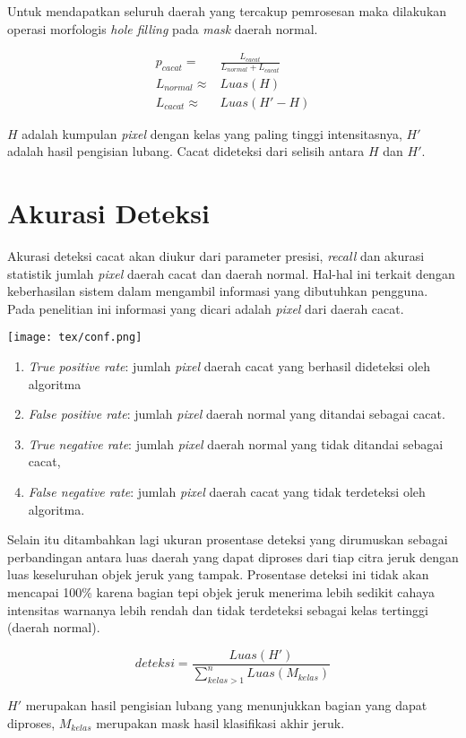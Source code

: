 \documentclass[laporan.tex]{subfiles}
\begin{document}
Untuk mendapatkan seluruh daerah yang tercakup pemrosesan maka dilakukan operasi morfologis \emph{hole filling} pada \emph{mask} daerah normal.

\begin{align}
	p_{cacat} = & \frac{L_{cacat}}{L_{normal} + L_{cacat}} \\
	L_{normal} \approx & Luas(H) \\
	L_{cacat} \approx & Luas(H' - H)
\end{align}

$H$ adalah kumpulan \emph{pixel} dengan kelas yang paling tinggi intensitasnya, $H'$ adalah hasil pengisian lubang. Cacat dideteksi dari selisih antara $H$ dan $H'$.

\section{Akurasi Deteksi}

Akurasi deteksi cacat akan diukur dari parameter presisi, \emph{recall} dan akurasi statistik jumlah \emph{pixel} daerah cacat dan daerah normal. Hal-hal ini terkait dengan keberhasilan sistem dalam mengambil informasi yang dibutuhkan pengguna. Pada penelitian ini informasi yang dicari adalah \emph{pixel} dari daerah cacat.

\texttt{[image: tex/conf.png]}


\begin{enumerate}
\item \emph{True positive rate}: jumlah \emph{pixel} daerah cacat yang berhasil dideteksi oleh algoritma
\item \emph{False positive rate}: jumlah \emph{pixel} daerah normal yang ditandai sebagai cacat.
\item \emph{True negative rate}: jumlah \emph{pixel} daerah normal yang tidak ditandai sebagai cacat, 
\item \emph{False negative rate}: jumlah \emph{pixel} daerah cacat yang tidak terdeteksi oleh algoritma.
\end{enumerate}

Selain itu ditambahkan lagi ukuran prosentase deteksi yang dirumuskan sebagai perbandingan antara luas daerah yang dapat diproses dari tiap citra jeruk dengan luas keseluruhan objek jeruk yang tampak. Prosentase deteksi ini tidak akan mencapai 100\% karena bagian tepi objek jeruk menerima lebih sedikit cahaya intensitas warnanya lebih rendah dan tidak terdeteksi sebagai kelas tertinggi (daerah normal).

\begin{equation}
	deteksi = \frac{Luas(H')}{\sum_{kelas>1}^n Luas(M_{kelas})}
\end{equation}

$H'$ merupakan hasil pengisian lubang yang menunjukkan bagian yang dapat diproses, $M_{kelas}$ merupakan mask hasil klasifikasi akhir jeruk.
\end{document}
